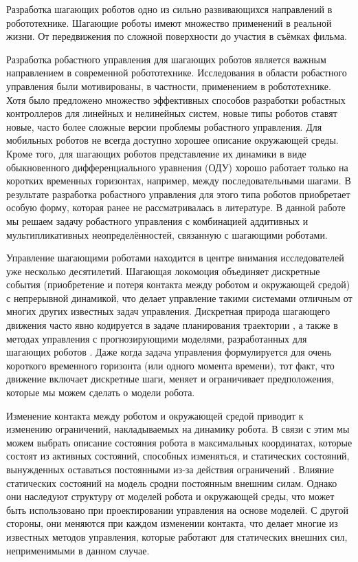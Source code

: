 
{\actuality} 
Разработка шагающих роботов одно из сильно развивающихся направлений в робототехнике. Шагающие роботы имеют множество применений в реальной жизни. От передвижения по сложной поверхности до участия в съёмках фильма.

Разработка робастного управления для шагающих роботов является важным направлением в современной робототехнике. Исследования в области робастного управления были мотивированы, в частности, применением в робототехнике. Хотя было предложено множество эффективных способов разработки робастных контроллеров для линейных \cite{POLYAK2021,Nicolett2018} и нелинейных \cite{HAUSWIRTH2024,Celentano2018} систем, новые типы роботов ставят новые, часто более сложные версии проблемы робастного управления. Для мобильных роботов не всегда доступно хорошее описание окружающей среды. Кроме того, для шагающих роботов представление их динамики в виде обыкновенного дифференциального уравнения (ОДУ) хорошо работает только на коротких временных горизонтах, например, между последовательными шагами. В результате разработка робастного управления для этого типа роботов приобретает особую форму, которая ранее не рассматривалась в литературе. В данной работе мы решаем задачу робастного управления с комбинацией аддитивных и мультипликативных неопределённостей, связанную с шагающими роботами.

Управление шагающими роботами находится в центре внимания исследователей уже несколько десятилетий. Шагающая локомоция объединяет дискретные события (приобретение и потеря контакта между роботом и окружающей средой) с непрерывной динамикой, что делает управление такими системами отличным от многих других известных задач управления. Дискретная природа шагающего движения часто явно кодируется в задаче планирования траектории \cite{katayama2022whole, lu2023whole}, а также в методах управления с прогнозирующими моделями, разработанных для шагающих роботов \cite{KIM2019, chignoli2021humanoid}. Даже когда задача управления формулируется для очень короткого временного горизонта (или одного момента времени), тот факт, что движение включает дискретные шаги, меняет и ограничивает предположения, которые мы можем сделать о модели робота.

Изменение контакта между роботом и окружающей средой приводит к изменению ограничений, накладываемых на динамику робота. В связи с этим мы можем выбрать описание состояния робота в максимальных координатах, которые состоят из активных состояний, способных изменяться, и статических состояний, вынужденных оставаться постоянными из-за действия ограничений \cite{SAVIN2021}. Влияние статических состояний на модель сродни постоянным внешним силам. Однако они наследуют структуру от моделей робота и окружающей среды, что может быть использовано при проектировании управления на основе моделей. С другой стороны, они меняются при каждом изменении контакта, что делает многие из известных методов управления, которые работают для статических внешних сил, неприменимыми в данном случае.

